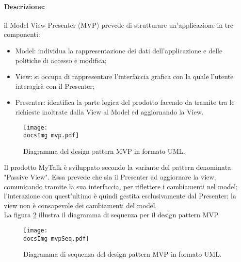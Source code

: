 {{	\paragraph{Descrizione: }{il Model View Presenter (MVP) prevede di strutturare un'applicazione in tre componenti:
	\begin{itemize}
		\item Model: individua la rappresentazione dei dati dell'applicazione e delle politiche di accesso e modifica;
		\item View: si occupa di rappresentare l'interfaccia grafica con la quale l'utente interagirà con il Presenter;
		\item Presenter: identifica la parte logica del prodotto facendo da tramite tra le richieste inoltrate dalla View al Model ed aggiornando la View.
	\end{itemize}
	\begin{figure}[h!tbp]
		\centering
		\texttt{[image: \\docsImg mvp.pdf]}
		\caption{Diagramma del design pattern MVP in formato UML\g .}
		\label{fig:mvpClassi}
\end{figure}
	Il prodotto MyTalk è sviluppato secondo la variante del pattern denominata "Passive View".
Essa prevede che sia il Presenter ad aggiornare la view, comunicando tramite la sua interfaccia, per riflettere i cambiamenti nel model; l'interazione con quest'ultimo è quindi gestita esclusivamente dal Presenter: la view non è consapevole dei cambiamenti del model.\\
La figura \ref{fig:mvpSeq} illustra il diagramma di sequenza per il design pattern MVP.
	\begin{figure}[h!tbp]
		\centering
		\texttt{[image: \\docsImg mvpSeq.pdf]}
		\caption{Diagramma di sequenza del design pattern MVP in formato UML\g .}
		\label{fig:mvpSeq}
\end{figure}
}
}}
